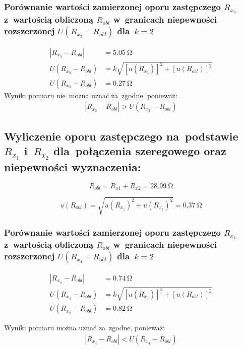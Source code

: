 \documentclass{fizraport}
\begin{document}
\subsubsection{Porównanie wartości zamierzonej oporu zastępczego $R_{x_3}$ z~wartością obliczoną $R_{{obl}}$ w~granicach niepewności rozszerzonej $U(R_{x_3}-R_{{obl}})$ dla~$k=2$}
\begin{align*}
    |R_{x_3}-R_{{obl}}| &= \SI{5.05}{\ohm} \\
    U(R_{x_3}-R_{{obl}}) &= k\sqrt{[u(R_{x_3})]^2 + [u(R_{{obl}})]^2}  \\
    U(R_{x_3}-R_{{obl}}) &= \SI{0.27}{\ohm}
\end{align*}
Wyniki pomiaru nie~można uznać za~zgodne, ponieważ:
\begin{align*}
    |R_{x_3}-R_{obl}| > U(R_{x_3}-R_{obl}) 
\end{align*}    
\pagebreak


\subsection{Wyliczenie oporu zastępczego na~podstawie $R_{x_1}$ i~$R_{x_2}$ dla~połączenia szeregowego oraz niepewności wyznaczenia:}
\begin{equation*}
        R_{{obl}}= R_{x1} + R_{x2} = \SI{28.99}{\ohm}
\end{equation*}

\begin{equation*}
    u(R_{obl}) = \sqrt{u(R_{x_1})^2 + u(R_{x_2})^2} = \SI{0.37}{\ohm}
\end{equation*}

\subsubsection{Porównanie wartości zamierzonej oporu zastępczego $R_{x_4}$ z~wartością obliczoną $R_{{obl}}$ w~granicach niepewności rozszerzonej $U(R_{x_4}-R_{{obl}})$ dla~$k=2$}
\begin{align*}
    |R_{x_4}-R_{{obl}}| &= \SI{0.74}{\ohm} \\
    U(R_{x_4}-R_{{obl}}) &= k\sqrt{[u(R_{x_4})]^2 + [u(R_{{obl}})]^2}  \\
    U(R_{x_4}-R_{{obl}}) &= \SI{0.82}{\ohm}
\end{align*}
    
Wyniki pomiaru można uznać za~zgodne, ponieważ:
\begin{align*}
    |R_{x_4}-R_{obl}| < U(R_{x_4}-R_{obl}) 
\end{align*}
\end{document}
